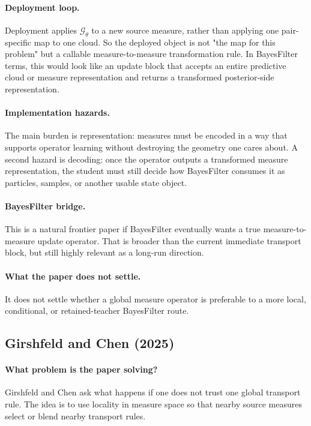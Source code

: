\documentclass[11pt]{report}
\begin{document}
\paragraph{Deployment loop.}
Deployment applies $\mathcal G_\theta$ to a new source measure, rather than applying
one pair-specific map to one cloud.  So the deployed object is not "the map for this
problem" but a callable measure-to-measure transformation rule.  In BayesFilter
terms, this would look like an update block that accepts an entire predictive cloud or
measure representation and returns a transformed posterior-side representation.

\paragraph{Implementation hazards.}
The main burden is representation: measures must be encoded in a way that supports
operator learning without destroying the geometry one cares about.  A second hazard is
decoding: once the operator outputs a transformed measure representation, the student
must still decide how BayesFilter consumes it as particles, samples, or another usable
state object.

\paragraph{BayesFilter bridge.}
This is a natural frontier paper if BayesFilter eventually wants a true
measure-to-measure update operator.  That is broader than the current immediate
transport block, but still highly relevant as a long-run direction.

\paragraph{What the paper does not settle.}
It does not settle whether a global measure operator is preferable to a more local,
conditional, or retained-teacher BayesFilter route.

\subsection*{Girshfeld and Chen (2025)}

\paragraph{What problem is the paper solving?}
Girshfeld and Chen ask what happens if one does not trust one global transport rule.
The idea is to use locality in measure space so that nearby source measures select
or blend nearby transport rules.
\end{document}
